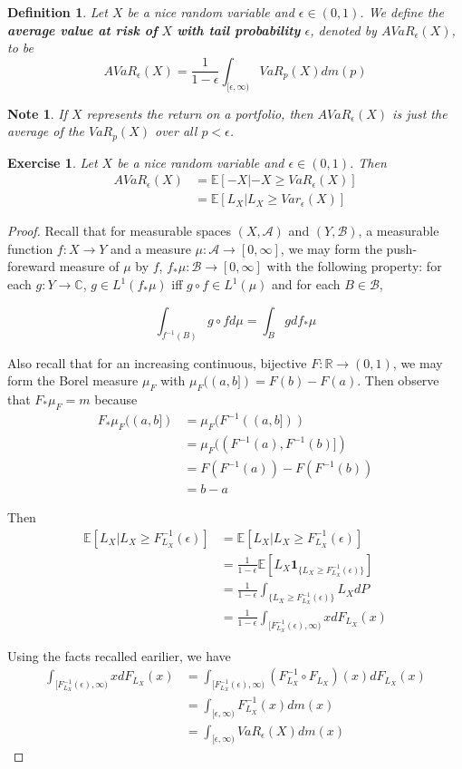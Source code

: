 \documentclass[12pt]{amsart}
\newtheorem{defn}[thm]{Definition}
\newtheorem{note}[thm]{Note}
\newtheorem{ex}[thm]{Exercise}
\newcommand{\ep}{\epsilon}
\newcommand{\C}{\mathbb{C}}
\newcommand{\E}{\mathbb{E}}
\newcommand{\R}{\mathbb{R}}
\newcommand{\MA}{\mathcal{A}}
\newcommand{\MB}{\mathcal{B}}
\newcommand{\RG}{[0,\infty]}
\begin{document}
 \begin{defn}
Let $X$ be a nice random variable and $\ep \in (0,1)$. We define the \textbf{average value at risk of } $X$ \textbf{with tail probability } $\ep$, denoted by $AVaR_{\ep}(X)$, to be $$AVaR_{\ep}(X) = \frac{1}{1-\ep}\int_{[\ep,\infty)}VaR_p(X)dm(p)$$
\end{defn}

\begin{note}
If $X$ represents the return on a portfolio, then $AVaR_{\ep}(X)$ is just the average of the $VaR_{p}(X)$ over all $p< \ep$.
\end{note}

\begin{ex}
Let $X$ be a nice random variable and $\ep \in (0,1)$. Then 
\begin{align*}
AVaR_{\ep}(X) 
&= \E[-X|-X \geq VaR_{\ep}(X)]\\
&= \E[L_X|L_X \geq Var_{\ep}(X)]
\end{align*}
\end{ex}

\begin{proof}
Recall that for measurable spaces $(X,\MA)$ and $(Y, \MB)$, a measurable function $f:X \rightarrow Y$ and a measure $\mu:\MA \rightarrow \RG$, we may form the push-foreward measure of $\mu$ by $f$, $f_{*}\mu:\MB \rightarrow \RG$ with the following property: for each $g:Y \rightarrow \C$, $g \in L^1(f_* \mu)$ iff  $g \circ f \in L^1(\mu)$ and for each $B \in \MB$, 

$$\int_{f^{-1}(B)}g \circ f d\mu = \int_B g d f_*\mu$$

Also recall that for an increasing continuous, bijective $F:\R \rightarrow (0,1)$, we may form the Borel measure $\mu_F$ with $\mu_F((a,b]) = F(b)-F(a)$. Then observe that $F_*\mu_F = m$ because
\begin{align*}
{F}_{*} \mu_F ((a,b]) 
&= \mu_F(F^{-1}((a,b]))\\
&= \mu_F((F^{-1}(a), F^{-1}(b)]) \\ 
&= F(F^{-1}(a)) - F(F^{-1}(b))\\
&= b-a
\end{align*}

Then  
\begin{align*}
\E[L_X |L_X \geq F^{-1}_{L_X}(\ep)] 
&= \E[L_X|L_X \geq F^{-1}_{L_X}(\ep)] \\ 
&= \frac{1}{1-\ep}\E [L_X \mathbf{1}_{\{L_X \geq F^{-1}_{L_X}(\ep)\}}] \\ 
&=  \frac{1}{1-\ep} \int_{\{L_X \geq F_{L_X}^{-1}(\ep)\}}L_X dP \\
& = \frac{1}{1-\ep} \int_{[F_{L_X}^{-1}(\ep),  \infty)}xd F_{L_X}(x)
\end{align*}

Using the facts recalled earilier, we have  
\begin{align*}
\int_{[F_{L_X}^{-1}(\ep),  \infty)}xd F_{L_X}(x) 
&= \int_{[F_{L_X}^{-1}(\ep),  \infty)}(F^{-1}_{L_X} \circ F_{L_X}) (x)d F_{L_X}(x) \\
&= \int_{[\ep,  \infty)} F^{-1}_{L_X}(x)dm(x)\\
&= \int_{[\ep,  \infty)} VaR_{\ep}(X)dm(x)
\end{align*}
\end{proof}
\end{document}
